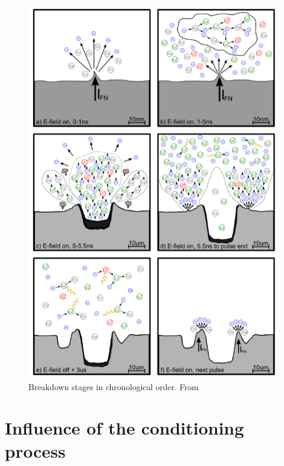 \begin{figure}[h]
\centering
\includegraphics[scale=0.6]{pictures/BD_process}
\caption{Breakdown stages in chronological order. From \cite{Kovermann:1330346}}
\label{BD_rocess}
\end{figure}


\section[Influence of the conditioning process]{Influence of the conditioning process}























